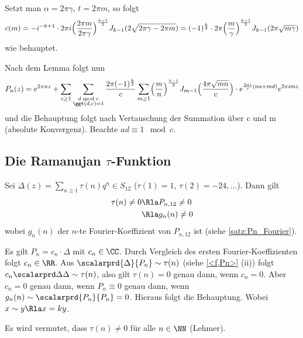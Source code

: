 \begin{bewe}
\begin{bewe}
Setzt man $\alpha = 2\pi \gamma$, $t = 2\pi m$, so folgt
\[
	c(m) = -i^{-k+1} \cdot 2\pi i \Bigl( \frac{2\pi m}{2\pi \gamma}\Bigr)^{\frac{k-1}{2}} J_{k-1} (2\sqrt{2\pi \gamma - 2 \pi m}) = (-1)^{\frac{k}{2}} \cdot 2\pi \Bigl(\frac{m}{\gamma}\Bigr)^{\frac{k-1}{2}} J_{k-1} (2\pi \sqrt{m\gamma})
\]
wie behauptet.


\end{bewe}

Nach dem Lemma folgt nun
\[
	P_n(z) = e^{2\pi nz} + \sum_{c\geq1} \sum_{\substack{d \bmod c\\ \ggt(d,c) = 1}} \frac{2\pi (-1)^{\frac{k}{2}}}{c} \sum_{m\geq 1} \Bigl(\frac{m}{n}\Bigr)^{\frac{k-1}{2}} J_{m-1} \Bigl(\frac{4\pi \sqrt{mn}}{c}\Bigr) \cdot e^{\frac{2\pi i}{c}(na+md)} e^{2\pi imz}
\]
und die Behauptung folgt nach Vertauschung der Summation über c und m (absolute Konvergenz). Beachte $ad \equiv 1 \mod c$.

\end{bewe}

\subsection[Die Ramanujan \texorpdfstring{$\tau$}{tau}-Funktion]{Die Ramanujan {\boldmath $\tau$}-Funktion}

\begin{satz}
	Sei $\Delta(z) = \sum_{n \geq 1} \tau(n) q^n \in S_{12}$ ($\tau(1) = 1$, $\tau(2) = -24, \ldots $).
	Dann gilt
	\begin{align*}
		\tau(n) \not= 0
		&\Rla P_{n,12} \not= 0 \\
		&\Rla g_n(n) \not= 0
	\end{align*}
	wobei $g_n(n)$ der $n$-te Fourier-Koeffizient von $P_{n,12}$ ist (siehe \autoref{satz:Pn_Fourier}).
\end{satz}
\begin{bewe}
	Es gilt $P_n = c_n \cdot \Delta$ mit $c_n \in \CC$.
	Durch Vergleich des ersten Fourier-Koeffizienten folgt $c_n \in \RR$.
	Aus $\scalarprd{\Delta}{P_n} \sim \tau(n)$ (siehe \autoref{<f,Pn>} (ii)) folgt $c_n \scalarprd \Delta \Delta \sim \tau(n)$, also gilt $\tau(n) = 0$ genau dann, wenn $c_n = 0$. Aber $c_n = 0$ genau dann, wenn $P_n \equiv 0$ genau dann, wenn $g_n(n) \sim \scalarprd{P_n}{P_n} = 0$.
	Hieraus folgt die Behauptung.
	Wobei $x \sim y \Rla x = ky$.
\end{bewe}

\begin{beme}
	Es wird vermutet, dass $\tau(n) \not= 0$ für alle $n\in\NN$ (Lehmer).
\end{beme}

